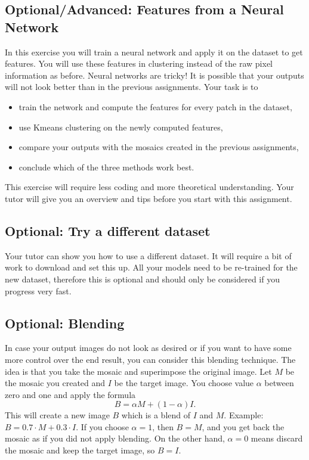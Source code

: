 \documentclass[a4paper]{article}
\begin{document}
	\subsection{Optional/Advanced: Features from a Neural Network}
		In this exercise you will train a neural network and apply it on the dataset to get features. 
		You will use these features in clustering instead of the raw pixel information as before.
		Neural networks are tricky! It is possible that your outputs will not look better than in the previous assignments.
		Your task is to
		\begin{itemize}
			\item train the network and compute the features for every patch in the dataset,
			\item use Kmeans clustering on the newly computed features,
			\item compare your outputs with the mosaics created in the previous assignments,
			\item conclude which of the three methods work best.
		\end{itemize}
		This exercise will require less coding and more theoretical understanding.
		Your tutor will give you an overview and tips before you start with this assignment.
	
	\subsection{Optional: Try a different dataset}
		Your tutor can show you how to use a different dataset. 
		It will require a bit of work to download and set this up.
		All your models need to be re-trained for the new dataset, therefore this is optional and should only be considered if you progress very fast.
		
		
	\subsection{Optional: Blending}
		In case your output images do not look as desired or if you want to have some more control over the end result, you can consider this blending technique.
		The idea is that you take the mosaic and superimpose the original image.
		Let $M$ be the mosaic you created and $I$ be the target image.
		You choose value $\alpha$ between zero and one and apply the formula
		\begin{equation}
			B = \alpha M + (1 - \alpha) I.
		\end{equation}
		This will create a new image $B$ which is a blend of $I$ and $M$.
		Example: $B = 0.7 \cdot M + 0.3 \cdot I$.
		If you choose $\alpha = 1$, then $B = M$, and you get back the mosaic as if you did not apply blending.
		On the other hand, $\alpha = 0$ means discard the mosaic and keep the target image, so $B = I$.
\end{document}

